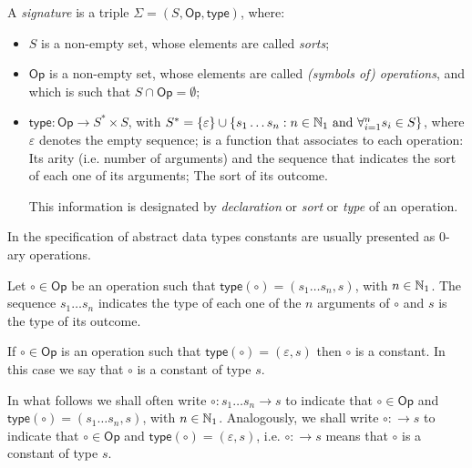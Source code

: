 \begin{definition}
	A \emph{signature} is a triple $\Sigma = (S, \mathsf{Op}, \mathsf{type})$, where:
	\begin{itemize}
		\item $S$ is a non-empty set, whose elements are called \emph{sorts};
		\item $\mathsf{Op}$ is a non-empty set, whose elements are called \emph{(symbols of) operations}, and which is such that $S \cap \mathsf{Op} = \emptyset$;
		\item $\mathsf{type} : \mathsf{Op} \to S^* \times S$, with $S^* = \{ \varepsilon \} \cup \{ s_1 \ldots s_n : n \in \mathbb{N}_1 \text{ and } \forall_{i=1}^n s_i \in S \}$, where $\varepsilon$ denotes the empty sequence; is a function that associates to each operation:
			\subitem Its arity (i.e. number of arguments) and the sequence that indicates the sort of each one of its arguments;
			\subitem The sort of its outcome.

		This information is designated by \emph{declaration} or \emph{sort} or \emph{type} of an operation.
	\end{itemize}
\end{definition}
In the specification of abstract data types constants are usually presented as $0$-ary operations.\par
Let $\circ \in \mathsf{Op}$ be an operation such that $\mathsf{type}(\circ) = (s_1 \ldots s_n, s)$, with $n \in \mathbb{N}_1$. The sequence $s_1 \ldots s_n$ indicates the type of each one of the $n$ arguments of $\circ$ and $s$ is the type of its outcome. \par
If $\circ \in \mathsf{Op}$ is an operation such that $\mathsf{type}(\circ) = ( \varepsilon, s )$ then $\circ$ is a constant. In this case we say that $\circ$ is a constant of type $s$. \par
In what follows we shall often write $\circ : s_1 \ldots s_n \to s$ to indicate that $\circ \in \mathsf{Op}$ and $\mathsf{type}(\circ) = (s_1 \ldots s_n, s)$, with $n \in \mathbb{N}_1$. Analogously, we shall write $\circ : \to s$ to indicate that $\circ \in \mathsf{Op}$ and $\mathsf{type}(\circ) = (\varepsilon, s)$, i.e. $\circ : \to s$ means that $\circ$ is a constant of type $s$.


